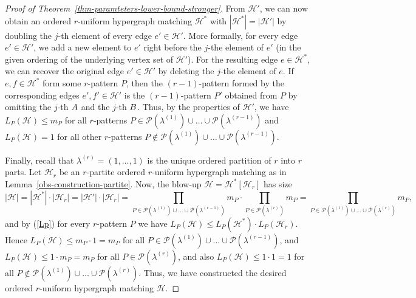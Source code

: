 \documentclass[11pt]{article}
\theoremstyle{definition}
\numberwithin{equation}{section}
\numberwithin{figure}{section}
\newcommand{\HH}{\mathcal{H}}
\newcommand{\PP}{\mathcal{P}}
\begin{document}
\begin{proof}[Proof of Theorem~\ref{thm-paramteters-lower-bound-stronger}]
From $\HH'$, we can now obtain an ordered $r$-uniform hypergraph matching $\HH^*$ with $|\HH^*|=|\HH'|$ by doubling the $j$-th element of every edge $e'\in \HH'$. More formally, for every edge $e'\in \HH'$, we add a new element to $e'$ right before the $j$-the element of $e'$ (in the given ordering of the underlying vertex set of $\HH'$). For the resulting edge $e\in \HH^*$, we can recover the original edge $e'\in \HH'$ by deleting the $j$-the element of $e$. If $e,f\in \HH^*$ form some $r$-pattern $P$, then the $(r-1)$-pattern formed by the corresponding edges $e',f'\in \HH'$ is the $(r-1)$-pattern $P'$ obtained from $P$ by omitting the $j$-th $\rm A$ and the $j$-th $\rm B$. Thus, by the properties of $\HH'$, we have $L_P(\HH)\le m_P$ for all $r$-patterns $P\in \PP(\lambda^{(1)})\cup\dots\cup \PP(\lambda^{(r-1)})$ and $L_P(\HH)=1$ for all other $r$-patterns $P\not\in \PP(\lambda^{(1)})\cup\dots\cup \PP(\lambda^{(r-1)})$.

Finally, recall that $\lambda^{(r)}=(1,\dots,1)$ is the unique ordered partition of $r$ into $r$ parts. Let $\HH_r$ be an $r$-partite ordered $r$-uniform hypergraph matching as in Lemma~\ref{obs-construction-partite}. Now, the blow-up $\HH=\HH^*[\HH_r]$ has size
\[|\HH|=|\HH^*|\cdot |\HH_r|=|\HH'|\cdot |\HH_r|=\prod_{P\in \PP(\lambda^{(1)})\cup\dots\cup \PP(\lambda^{(r-1)})} m_{P}\cdot \prod_{P\in \PP(\lambda^{(r)})} m_{P}=\prod_{P\in \PP(\lambda^{(1)})\cup\dots\cup \PP(\lambda^{(r)})} m_{P},\]
and by (\ref{Lp}) for every $r$-pattern $P$ we have $L_P(\HH)\le L_P(\HH^*)\cdot L_P(\HH_r)$. Hence $L_P(\HH)\le m_P\cdot 1=m_P$ for all $P\in \PP(\lambda^{(1)})\cup\dots\cup \PP(\lambda^{(r-1)})$, and $L_P(\HH)\le 1\cdot m_P=m_P$ for all $P\in \PP(\lambda^{(r)})$, and also $L_P(\HH)\le 1\cdot 1=1$ for all $P\not\in \PP(\lambda^{(1)})\cup\dots\cup \PP(\lambda^{(r)})$. Thus, we have constructed the desired ordered $r$-uniform hypergraph matching $\HH$.
\end{proof}
\end{document}
